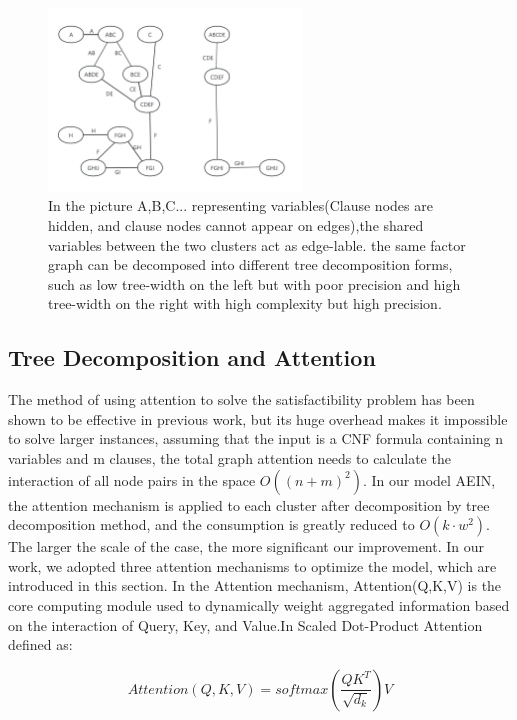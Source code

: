 \begin{figure}[h]
\centering 
\includegraphics[width=0.6\textwidth]{png/JG.png}
\caption{In the picture A,B,C... representing variables(Clause nodes are hidden, and clause nodes 
cannot appear on edges),the shared variables between the two clusters act as edge-lable. the same 
factor graph can be decomposed into different tree decomposition forms, such as low tree-width on the 
left but with poor precision and high tree-width on the right with high complexity but high precision.} 
\label{fig2}
\end{figure}

\subsection{Tree Decomposition and Attention}
The method of using attention to solve the satisfactibility problem has been shown to be effective in 
previous work, but its huge overhead makes it impossible to solve larger instances, assuming that the 
input is a CNF formula containing n variables and m clauses, the total graph attention needs to calculate 
the interaction of all node pairs in the space \(O((n+m)^2)\). In our model AEIN, the attention mechanism 
is applied to each cluster after decomposition by tree decomposition method, and the consumption is greatly 
reduced to \(O(k⋅w^2)\). The larger the scale of the case, the more significant our improvement.
In our work, we adopted three attention mechanisms to optimize the model, which are introduced in this section.
In the Attention mechanism, Attention(Q,K,V) is the core computing module used to dynamically weight 
aggregated information based on the interaction of Query, Key, and Value.In Scaled Dot-Product Attention 
defined as:

\begin{equation}
Attention(Q,K,V)=softmax(\frac{QK^T}{\sqrt{d_k}})V
\end{equation}


